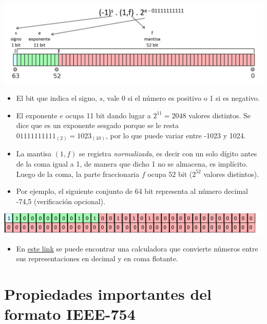\documentclass[openany]{book}
\providecommand{\tightlist}{%
  \setlength{\itemsep}{0pt}\setlength{\parskip}{0pt}}
\begin{document}
\begin{center}\includegraphics[width=0.9\linewidth]{Plots/U1/float64_2} \end{center}

\begin{itemize}
\item
  El bit que indica el signo, \(s\), vale 0 si el número es positivo o 1 si es negativo.
\item
  El exponente \(e\) ocupa 11 bit dando lugar a \(2^{11} = 2048\) valores distintos. Se dice que es un exponente sesgado porque se le resta \(01111111111_{(2)} = 1023_{(10)}\), por lo que puede variar entre -1023 y 1024.
\item
  La mantisa \((1,f)\) se registra \emph{normalizada}, es decir con un solo dígito antes de la coma igual a 1, de manera que dicho 1 no se almacena, es implícito. Luego de la coma, la parte fraccionaria \(f\) ocupa 52 bit (\(2^{52}\) valores distintos).
\item
  Por ejemplo, el siguiente conjunto de 64 bit representa al número decimal -74,5 (verificación opcional).
\end{itemize}

\begin{center}\includegraphics[width=1\linewidth]{Plots/U1/floatej} \end{center}

\begin{itemize}
\tightlist
\item
  En \href{http://weitz.de/ieee/}{este link} se puede encontrar una calculadora que convierte números entre sus representaciones en decimal y en coma flotante.
\end{itemize}

\hypertarget{propiedades-importantes-del-formato-ieee-754}{%
\section{Propiedades importantes del formato IEEE-754}\label{propiedades-importantes-del-formato-ieee-754}}
\end{document}
